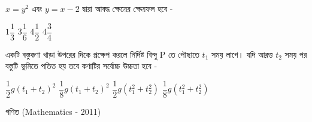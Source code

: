 \documentclass[addpoints]{exam}
\begin{document}
\begin{questions}
\begin{oneparchoices}
\end{oneparchoices}

\question  $ x=y^{2} $  এবং $ y=x-2 $ দ্বারা আবদ্ধ ক্ষেত্রের ক্ষেত্রফল হবে -

\begin{oneparchoices}
\choice $ 1\dfrac{1}{3} $
\choice $ 3\dfrac{1}{6} $
\choice $ 4\dfrac{1}{2} $
\choice $ 4\dfrac{3}{4} $
\end{oneparchoices}

\question  একটি বস্তুকণা খাড়া উপরের দিকে প্রক্ষেপ করলে নির্দিষ্ট বিন্দু P তে পৌছাতে $ t_{1} $ সময় লাগে। যদি আরত্ত $ t_{2} $  সময় পর বস্তুটি ভুমিতে পতিত হয় তবে কণাটির সর্বোচ্চ উচ্চতা হবে - 

\begin{oneparchoices}
\choice $ \dfrac{1}{2}g(t_{1}+t_{2})^{2} $
\choice $ \dfrac{1}{8}g(t_{1}+t_{2})^{2} $
\choice $ \dfrac{1}{2}g(t_{1}^{2}+t_{2}^{2}) $
\choice $ \dfrac{1}{8}g(t_{1}^{2}+t_{2}^{2}) $
\end{oneparchoices}

\end{questions}
\begin{LARGE}
\begin{center}
গণিত (Mathematics - 2011)
\end{center}
\end{LARGE}
\end{document}
